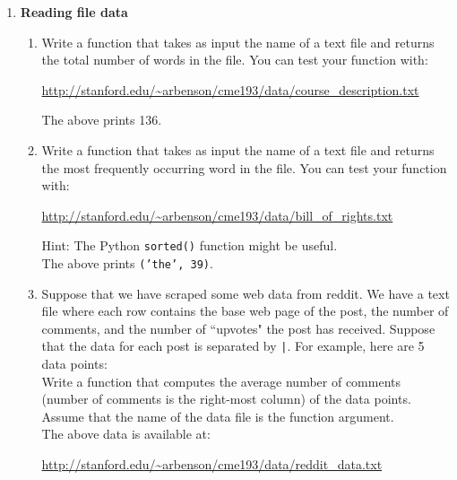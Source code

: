 \documentclass{article}
\newcounter{points}
\begin{document}
\pagestyle{fancy}
\begin{enumerate}

\item \textbf{Reading file data}
\begin{enumerate}
\item Write a function that takes as input the name of a text file and returns the total number of words in the file.  You can test your function with:
\begin{center}
\url{http://stanford.edu/~arbenson/cme193/data/course_description.txt}
\end{center}


The above prints 136.
\end{enumerate}

\begin{enumerate}
\setcounter{enumii}{1}
\item Write a function that takes as input the name of a text file and returns the most frequently occurring word in the file.  You can test your function with:
\begin{center}
\url{http://stanford.edu/~arbenson/cme193/data/bill_of_rights.txt}
\end{center}
Hint: The Python \texttt{sorted()} function might be useful. \\


The above prints \texttt{('the', 39)}.
\end{enumerate}

\newpage
\begin{enumerate}
\setcounter{enumii}{2}
\item Suppose that we have scraped some web data from reddit.  We have a text file where each row contains the base web page of the post, the number of comments, and the number of ``upvotes" the post has received.  Suppose that the data for each post is separated by \texttt{|}.  For example, here are 5 data points: \\

Write a function that computes the average number of comments (number of comments is the right-most column) of the data points.  Assume that the name of the data file is the function argument. \\

The above data is available at:
\begin{center}
\url{http://stanford.edu/~arbenson/cme193/data/reddit_data.txt}
\end{center}


\end{enumerate}
\end{enumerate}
\end{document}
